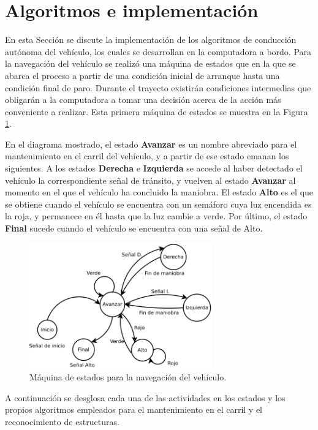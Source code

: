 \section{Algoritmos e implementación}
\label{sec:alg}
En esta Sección se discute la implementación de los algoritmos de conducción autónoma del vehículo, los cuales se desarrollan en la computadora a bordo. Para la navegación del vehículo se realizó una máquina de estados que en la que se abarca el proceso a partir de una condición inicial de arranque hasta una condición final de paro. Durante el trayecto existirán condiciones intermedias que obligarán a la computadora a tomar una decisión acerca de la acción más conveniente a realizar. Esta primera máquina de estados se muestra en la Figura \ref{fig:me1}.
\par En el diagrama mostrado, el estado {\bf Avanzar} es un nombre abreviado para el mantenimiento en el carril del vehículo, y a partir de ese estado emanan los siguientes. A los estados {\bf Derecha} e {\bf Izquierda} se accede al haber detectado el vehículo la correspondiente señal de tránsito, y vuelven al estado {\bf Avanzar} al momento en el que el vehículo ha concluido la maniobra. El estado {\bf Alto} es el que se obtiene cuando el vehículo se encuentra con un semáforo cuya luz encendida es la roja, y permanece en él hasta que la luz cambie a verde. Por último, el estado {\bf Final} sucede cuando el vehículo se encuentra con una señal de Alto.
\begin{figure}[htbp!]
	\centering
	\includegraphics[width=0.7\textwidth]{./Figuras/ME1}
	\caption{Máquina de estados para la navegación del vehículo.}
	\label{fig:me1}
\end{figure}
\par A continuación se desglosa cada una de las actividades en los estados y los propios algoritmos empleados para el mantenimiento en el carril y el reconocimiento de estructuras.
